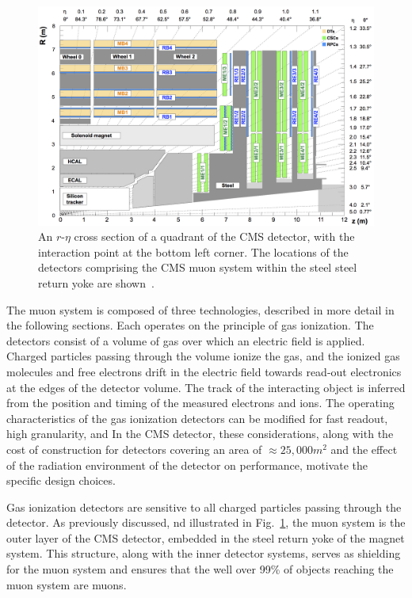 \begin{figure}[htbp]
  \centering
   \includegraphics[width=\textwidth]{figures/LHCandCMS/MuonSystemGeometry.png}
  \caption[An $r$-$\eta$ cross section of a quadrant of the CMS detector]{
    An $r$-$\eta$ cross section of a quadrant of the CMS detector, with the interaction
    point at the bottom left corner. The locations of the detectors
    comprising the CMS muon system within the steel steel return yoke
    are shown~\cite{Chatrchyan:2012xdj}.
        }
 \label{fig:muonSystemGeo}
\end{figure}

The muon system is composed of three technologies, 
described in more detail in the following sections. 
Each operates on the principle of gas ionization. 
The detectors consist of a volume of 
gas over which an electric field is applied. Charged
particles passing through the volume ionize the gas, and the ionized gas molecules
and free electrons drift in the electric field towards read-out electronics at the 
edges of the detector volume. The track of the interacting object is inferred from
the position and timing of the measured electrons and ions.
The operating characteristics of the gas ionization detectors can be modified
for fast readout, high granularity, and 
In the CMS detector, these considerations, along with the cost of construction 
for detectors covering an area of $\approx 25,000\unit{m}^2$ and 
the effect of the radiation environment of the detector on performance, motivate
the specific design choices.

Gas ionization detectors are
sensitive to all charged particles passing through the detector. As previously discussed,
nd illustrated in Fig.~\ref{fig:muonSystemGeo}, the muon system is 
the outer layer of the CMS detector, embedded in
the steel return yoke of the magnet system. This structure, along with the inner
detector systems, serves as shielding for the muon system and ensures that the 
well over 99\% of objects reaching the muon system are muons.

